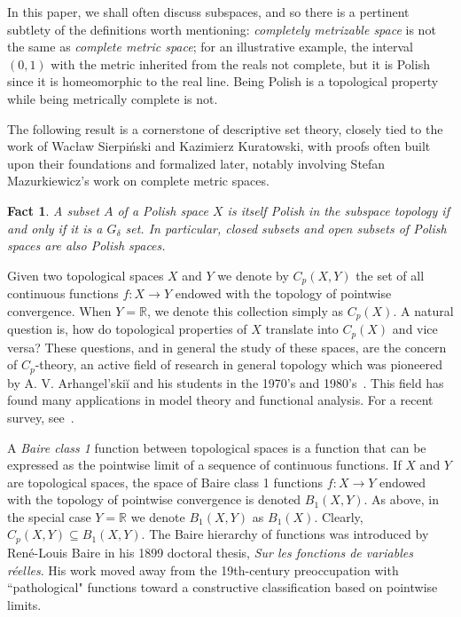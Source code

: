 \documentclass[psamsfonts]{amsart}
\newtheorem{fact}[thm]{Fact}
\theoremstyle{definition}
\theoremstyle{remark}
\numberwithin{equation}{section}
\begin{document}
In this paper, we shall often discuss  subspaces, and so there is a pertinent subtlety of the definitions worth mentioning: \emph{completely metrizable space} is not the same as \emph{complete metric space}; for an illustrative example, the interval $(0,1)$ with  the metric inherited from the reals not complete, but it is Polish since it is homeomorphic to the real line.
Being Polish is a topological property while being metrically complete is not.

The following result is a cornerstone of descriptive set theory, closely tied to the work of Wacław Sierpiński and Kazimierz Kuratowski, with proofs often built upon their foundations and formalized later, notably involving Stefan Mazurkiewicz's work on complete metric spaces.

\begin{fact}
A subset \(A\) of a Polish space \(X\) is itself Polish in the subspace topology if and only if it is a  $G_{\delta }$ set.
In particular, closed subsets and open subsets of Polish spaces are also Polish spaces.
\end{fact}

Given two topological spaces $X$ and $Y$ we denote by $C_p(X,Y)$ the set of all continuous functions $f:X\rightarrow Y$ endowed with the topology of pointwise convergence.
When $Y=\mathbb{R}$, we denote this collection simply as $C_p(X)$.
 A natural question is, how do topological properties of $X$ translate into $C_p(X)$ and vice versa? These questions, and in general the study of these spaces, are the concern of $C_p$-theory, an active field of research in general topology which was pioneered by A.
V.
Arhangel’skiĭ and his students in the 1970's and 1980's~\cite{Arkhangelskii:1992}.
This field has found many applications in model theory and functional analysis.
For a recent survey, see~\cite{tkachuk2011cp}.
 
 A  \emph{Baire class 1} function between topological spaces is a function that can be expressed as the pointwise limit of a sequence of continuous functions.
If $X$ and $Y$ are topological spaces, the space of Baire class 1 functions $f:X\rightarrow Y$ endowed with the topology of pointwise convergence is denoted $B_1(X,Y)$.
As above, in the special case $Y=\mathbb{R}$ we denote $B_1(X,Y)$ as $B_1(X)$.
Clearly, $C_p(X,Y)\subseteq B_1(X,Y)$.
The Baire hierarchy of functions was introduced by René-Louis Baire in his 1899 doctoral thesis, \emph{Sur les fonctions de variables réelles}.
His work moved away from the 19th-century preoccupation with ``pathological" functions toward a constructive classification based on pointwise limits.
\end{document}
